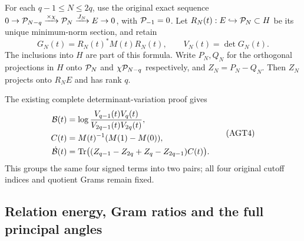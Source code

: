 For each $q-1\le N\le2q$, use the original exact sequence
$0\to\mathcal P_{N-q}\xrightarrow{\times\chi}\mathcal P_N
\xrightarrow{J_N}E\to0$, with $\mathcal P_{-1}=0$.
Let $R_N(t):E\hookrightarrow\mathcal P_N\subset H$ be its unique
minimum-norm section, and retain
\[
 G_N(t)=R_N(t)^*M(t)R_N(t),\qquad V_N(t)=\det G_N(t).
 \tag{AGT3}
\]
The inclusions into $H$ are part of this formula.
Write $P_N,Q_N$ for the orthogonal projections in $H$ onto
$\mathcal P_N$ and $\chi\mathcal P_{N-q}$ respectively, and
$Z_N=P_N-Q_N$. Then $Z_N$ projects onto $R_NE$ and has rank $q$.

The existing complete determinant-variation proof gives
\[
 \begin{aligned}
 \mathcal B(t)&=\log\frac{V_{q-1}(t)V_q(t)}
                              {V_{2q-1}(t)V_{2q}(t)},\\
 C(t)&=M(t)^{-1}(M(1)-M(0)),\\
 \dot{\mathcal B}(t)
 &=\operatorname{Tr}\bigl((Z_{q-1}-Z_{2q}+Z_q-Z_{2q-1})C(t)\bigr).
 \end{aligned}
 \tag{AGT4}
\]
This groups the same four signed terms into two pairs; all four
original cutoff indices and quotient Grams remain fixed.

\subsection{Relation energy, Gram ratios and the full principal angles}

